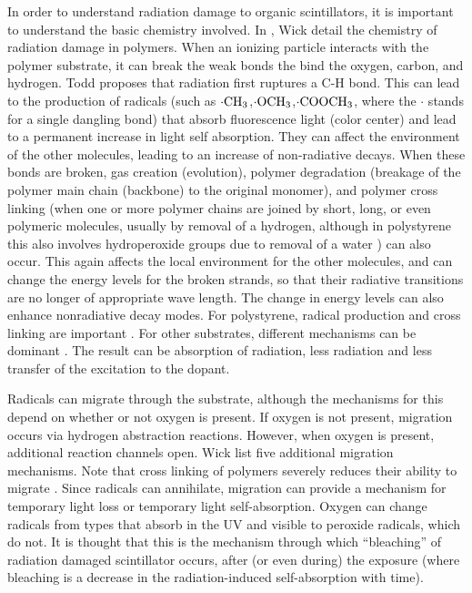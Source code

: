 In order to understand radiation damage to organic scintillators, it is important to
understand the basic chemistry involved.
In \cite{Wulkop1995141}, Wick \etal detail
the chemistry of radiation damage in polymers. 
When an ionizing particle interacts with the polymer substrate, it can
break the weak bonds the bind the oxygen, carbon, and hydrogen.
Todd\cite{todd} proposes that radiation first ruptures a C-H bond.
This can lead to the production
of radicals (such as  ${\rm \cdot CH_3}$,${\rm \cdot OCH_3}$,${\rm \cdot COOCH_3}$, where the $\cdot$ stands for a single dangling bond)
that absorb fluorescence light (color center) and lead to 
a permanent increase in light self absorption.
They can affect the environment of the other molecules, leading to
an increase of non-radiative decays.
When these bonds are broken, gas creation (evolution), polymer degradation (breakage 
of the polymer main chain (backbone) to the original monomer), 
and polymer cross linking
(when one or more polymer chains are joined by short, long, or even
polymeric molecules, usually by removal of a hydrogen,
although in polystyrene this also involves hydroperoxide groups due to removal of a water \cite{todd})
can also occur\cite{Wick1991472}.  
This again affects the local environment for the other molecules, and
can
change the energy levels for the broken strands, so that their
radiative transitions are no longer of appropriate wave length.
The change in energy levels can also enhance nonradiative decay modes.
For polystyrene, radical production and cross linking
are important \cite{Wick1991472}.  For other substrates, different
mechanisms can be dominant \cite{Wick1991472}.
The result can be absorption of radiation,
less radiation and less transfer of the
excitation to the dopant.


Radicals
can migrate through the substrate, although the mechanisms for this
depend on whether or not oxygen is present.  If oxygen
is not present, migration occurs via hydrogen abstraction reactions.
However, when oxygen is present, additional reaction channels open.
Wick \etal list five additional migration mechanisms.
Note that cross linking of polymers severely reduces their
ability to migrate \cite{weir}.
Since radicals can
annihilate, migration can provide  a mechanism for
temporary light loss or temporary light self-absorption.   
Oxygen can change radicals
from types that absorb in the UV and visible to peroxide radicals,
which do not.  It is thought that this is the mechanism
through which ``bleaching'' of radiation damaged scintillator
occurs, after (or even during) the exposure (where bleaching
is a decrease in the radiation-induced self-absorption with time).


